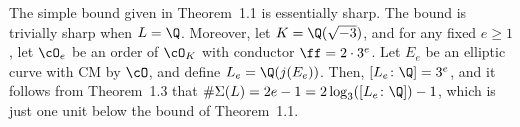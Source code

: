 \begin{rem}
The simple bound given in Theorem~1.1 is essentially sharp. The bound is trivially sharp when $L= \Q$. Moreover, let $K= \Q(\sqrt{-3})$, and for any fixed $e \geq 1$, let $\cO_e$ be an order of $\cO_K$ with conductor $\ff= 2 \cdot 3^e$. Let $E_e$ be an elliptic curve with CM by $\cO$, and define $L_e= \Q(j(E_e))$. Then, $[L_e \colon \Q]= 3^e$, and it follows from Theorem~1.3 that $\#\Sigma(L)= 2e - 1= 2\log_3([L_e \colon \Q]) - 1$, which is just one unit below the bound of Theorem~1.1. 
\end{rem}







